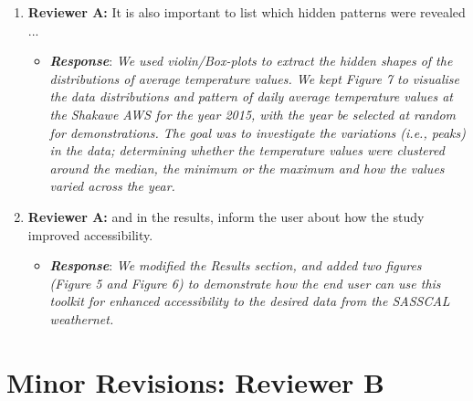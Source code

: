 \documentclass[a4paper, 12pt, conference]{ieeeconf}      %
\begin{document}
\begin{enumerate}
	\item  \textbf{Reviewer A:} It is also important to list which hidden patterns were revealed ...
		\begin{itemize}
		\item \textbf{\emph{Response}}:
		\emph{We used violin/Box-plots to extract the hidden shapes of the distributions of average temperature values. We kept  Figure	7 to visualise the data distributions and pattern of  daily average temperature values at the Shakawe AWS for the year 2015, with the year be selected at random for demonstrations. The goal was to investigate the variations (i.e., peaks) in
			the data; determining whether the temperature values were
			clustered around the median, the minimum or the maximum and how the values varied across the year.}
	\end{itemize}
	
	
	\item \textbf{Reviewer A:} and in the results, inform the user about how the study improved accessibility.
	
	\begin{itemize}
		\item \emph{\textbf{Response}}: \emph{We modified the Results section, and added two figures (Figure 5 and Figure 6) to demonstrate how the end user can use this toolkit for enhanced accessibility to  the desired data from the SASSCAL weathernet.}
	\end{itemize}
	
	

	\end{enumerate}
	
	\section{Minor Revisions: Reviewer B}
	
\end{document}
